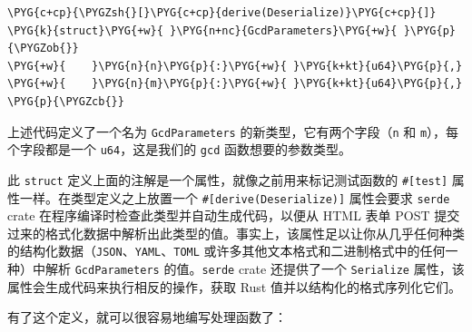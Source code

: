 \begin{Verbatim}[commandchars=\\\{\},breaklines=true,breakanywhere=true,fontsize=\codefont,xleftmargin=17bp]
\PYG{c+cp}{\PYGZsh{}[}\PYG{c+cp}{derive(Deserialize)}\PYG{c+cp}{]}
\PYG{k}{struct}\PYG{+w}{ }\PYG{n+nc}{GcdParameters}\PYG{+w}{ }\PYG{p}{\PYGZob{}}
\PYG{+w}{    }\PYG{n}{n}\PYG{p}{:}\PYG{+w}{ }\PYG{k+kt}{u64}\PYG{p}{,}
\PYG{+w}{    }\PYG{n}{m}\PYG{p}{:}\PYG{+w}{ }\PYG{k+kt}{u64}\PYG{p}{,}
\PYG{p}{\PYGZcb{}}
\end{Verbatim}

上述代码定义了一个名为 \texttt{GcdParameters} 的新类型，它有两个字段（\texttt{n} 和 \texttt{m}），每个字段都是一个 \texttt{u64}，这是我们的 \texttt{gcd} 函数想要的参数类型。

此 \texttt{struct} 定义上面的注解是一个属性，就像之前用来标记测试函数的 \texttt{\#[test]} 属性一样。在类型定义之上放置一个 \texttt{\#[derive(Deserialize)]} 属性会要求 \texttt{serde} crate 在程序编译时检查此类型并自动生成代码，以便从 HTML 表单 POST 提交过来的格式化数据中解析出此类型的值。事实上，该属性足以让你从几乎任何种类的结构化数据（\texttt{JSON}、\texttt{YAML}、\texttt{TOML} 或许多其他文本格式和二进制格式中的任何一种）中解析 \texttt{GcdParameters} 的值。\texttt{serde} crate 还提供了一个 \texttt{Serialize} 属性，该属性会生成代码来执行相反的操作，获取 Rust 值并以结构化的格式序列化它们。

有了这个定义，就可以很容易地编写处理函数了：

